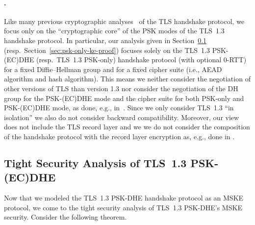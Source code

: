 \paragraph{.}
Like many previous cryptographic analyses~\cite{C:JKSS12,C:KraPatWee13,CCS:DFGS15,EuroSP:FisGue17,JC:DFGS21,JC:DieJag21,ACNS:DavGun21} of the TLS handshake protocol, we focus only on the ``cryptographic core'' of the PSK modes of the TLS~1.3 handshake protocol.
In particular, our analysis given in Section~\ref{sec:psk-ecdhe-ke-proof} (resp.\ Section~\ref{sec:psk-only-ke-proof}) focuses solely on the TLS~1.3 PSK-(EC)DHE (resp.\ TLS~1.3 PSK-only) handshake protocol (with optional $0$-RTT) for a fixed Diffie--Hellman group and for a fixed cipher suite (i.e., AEAD algorithm and hash algorithm).
This means we neither consider the negotiation of other versions of TLS than version 1.3 nor consider the negotiation of the DH group for the PSK-(EC)DHE mode and the cipher suite for both PSK-only and PSK-(EC)DHE mode,
as done, e.g., in~\cite{ACISP:DowSte15,SP:BBFGKZ16}.
Since we only consider TLS~1.3 ``in isolation'' we also do not consider backward compatibility.
Moreover, our view does not include the TLS record layer
and we we do not consider the composition of the handshake protocol with the record layer encryption as, e.g., done in \cite{CCS:DFGS15,thesis:Guenther18,JC:DFGS21,JC:DieJag21}.


\subsection{Tight Security Analysis of TLS~1.3 PSK-(EC)DHE}
\label{sec:psk-ecdhe-ke-proof}

Now that we modeled the TLS~1.3 PSK-DHE handshake protocol as an MSKE protocol, we come to the tight security analysis of TLS~1.3 PSK-DHE's MSKE security.
Consider the following theorem.

